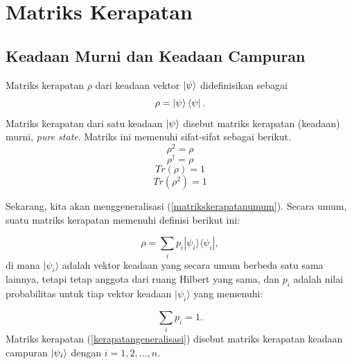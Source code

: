 \section{Matriks Kerapatan}
\subsection{Keadaan Murni dan Keadaan Campuran}
Matriks kerapatan $\rho$ dari keadaan vektor $\ket{\psi}$ didefinisikan sebagai
\begin{equation}
	\rho=\ket{\psi}\bra{\psi}.\label{matrikskerapatanumum}
\end{equation}
Matriks kerapatan dari satu keadaan $\ket{\psi}$ disebut matriks kerapatan (keadaan) murni, \textit{pure state}. Matriks ini memenuhi sifat-sifat sebagai berikut.
\begin{equation}
	\rho^2=\rho\label{sifatkerapatan2}
\end{equation}
\begin{equation}
	\rho^\dagger=\rho\label{sifatkerapatan3}
\end{equation}
\begin{equation}
	Tr(\rho)=1\label{sifatkerapatan4}
\end{equation}
\begin{equation}
	Tr(\rho^2)=1\label{sifatkerapatan5}
\end{equation}

\par
Sekarang, kita akan menggeneralisasi (\ref{matrikskerapatanumum}). Secara umum, suatu matriks kerapatan memenuhi definisi berikut ini:

\begin{equation}
	\rho=\sum_i p_i |\psi_i\rangle\langle\psi_i|,\label{kerapatangeneralisasi}
\end{equation}
di mana $|\psi_i\rangle$ adalah vektor keadaan yang secara umum berbeda satu sama lainnya, tetapi tetap anggota dari ruang Hilbert yang sama, dan $p_i$ adalah nilai probabilitas untuk tiap vektor keadaan $|\psi_i\rangle$ yang memenuhi:

\begin{equation}
	\sum_i p_i = 1.
\end{equation}
Matriks kerapatan (\ref{kerapatangeneralisasi}) disebut matriks kerapatan keadaan campuran $\ket{\psi_i}$ dengan $i=1,2,...,n$.

